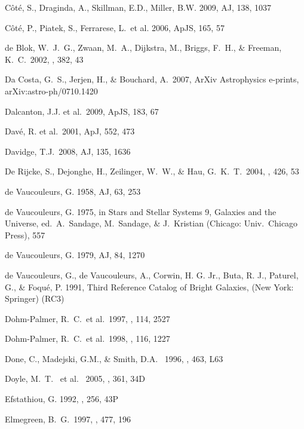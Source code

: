 \documentclass[12pt,onecolumn]{emulateapj}
\begin{document}
\begin{thebibliography}{}
C\^ot\'e, S., Draginda, A., Skillman, E.D., Miller, B.W. 2009, AJ, 138, 1037

C\^ot\'e, P., Piatek, S., Ferrarese, L.~et al. 2006, ApJS, 165, 57

 de Blok, W.~J.~G., 
Zwaan, M.~A., Dijkstra, M., Briggs, F.~H., \& Freeman, K.~C.\ 2002, \aap, 
382, 43 

Da Costa, G.~S., Jerjen, H., \& Bouchard, A.\ 2007, ArXiv Astrophysics e-prints, arXiv:astro-ph/0710.1420

Dalcanton, J.J. et al.\ 2009, ApJS, 183, 67 

Dav\'e, R. et al.\ 2001, ApJ, 552, 473

Davidge, T.J.\ 2008, AJ, 135, 1636

De Rijcke, S., Dejonghe, H., Zeilinger, W.~W., \& Hau, G.~K.~T.\ 2004, \aap, 426, 53 

de Vaucouleurs, G. 1958, AJ, 63, 253

de Vaucouleurs, G. 1975, in Stars and Stellar Systems 9, Galaxies
and the Universe, ed.\ A.\ Sandage, M.\ Sandage, \& J.\ Kristian
(Chicago: Univ.\ Chicago Press), 557

de Vaucouleurs, G. 1979, AJ, 84, 1270

de Vaucouleurs, G., de Vaucouleurs, A., Corwin, H. G. Jr.,
Buta, R. J., Paturel, G., \& Foqu\'e, P. 1991, Third Reference
Catalog of Bright Galaxies, (New York: Springer) (RC3)

Dohm-Palmer, R.~C.~et al.\ 1997, \aj, 114, 2527 

Dohm-Palmer, R.~C.~et al.\ 1998, \aj, 116, 1227 

Done, C., Madejski, G.M., \& Smith, D.A. \ 1996, \apj, 463, L63 

Doyle, M.~T. ~et al. \ 2005, \mnras, 361, 34D 

Efstathiou, G. 1992, \mnras, 256, 43P 

Elmegreen, B.~G.\ 1997, \apj, 477, 196 


\end{thebibliography}
\end{document}
